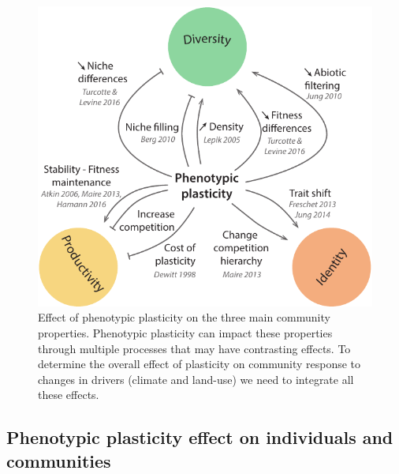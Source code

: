 {\begin{figure}
    \includegraphics{./1_Introduction/graphics/effect_plasticity.pdf}
  \caption[Phenotypic plasticity effect on community properties]{Effect of phenotypic plasticity on the three main community properties. Phenotypic plasticity can impact these properties through multiple processes that may have contrasting effects. To determine the overall effect of plasticity on community response to changes in drivers (climate and land-use) we need to integrate all these effects.}
  \label{fig:plasticity-effect}
\end{figure}

\subsection{Phenotypic plasticity effect on individuals and communities}

%



}
